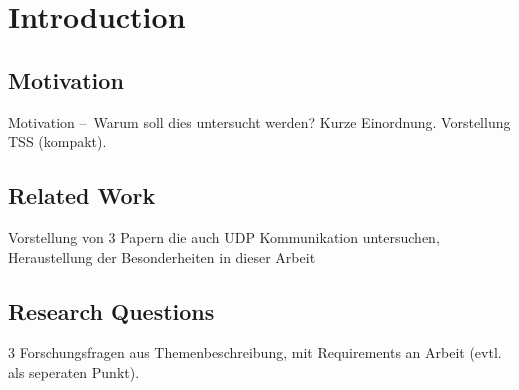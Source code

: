 \chapter{Introduction} \label{chap:introduction}


\section{Motivation} \label{chap:introduction:motivation}
Motivation – Warum soll dies untersucht werden? Kurze Einordnung. Vorstellung TSS (kompakt).

\section{Related Work} \label{chap:introduction:related_work}
Vorstellung von 3 Papern die auch UDP Kommunikation untersuchen, Heraustellung der Besonderheiten in dieser Arbeit


\section{Research Questions} \label{chap:introduction:research_questions}
3 Forschungsfragen aus Themenbeschreibung, mit Requirements an Arbeit (evtl. als seperaten Punkt).